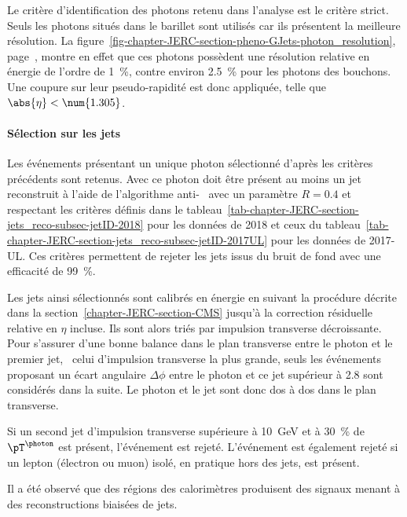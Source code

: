 \par Le critère d'identification des photons retenu dans l'analyse est le critère strict.
Seuls les photons situés dans le barillet sont utilisés car ils présentent la meilleure résolution.
La figure~\ref{fig-chapter-JERC-section-pheno-GJets-photon_resolution}, page~\pageref{fig-chapter-JERC-section-pheno-GJets-photon_resolution}, montre en effet que ces photons possèdent une résolution relative en énergie de l'ordre de \SI{1}{\%}, contre environ \SI{2.5}{\%} pour les photons des bouchons.
Une coupure sur leur pseudo-rapidité est donc appliquée, telle que $\abs{\eta} < \num{1.305}$.
\par {}
\paragraph{Sélection sur les jets}
Les événements présentant un unique photon sélectionné d'après les critères précédents sont retenus.
Avec ce photon doit être présent au moins un jet reconstruit à l'aide de l'algorithme anti-\kT~\cite{Cacciari_antikT} avec un paramètre $R=\num{0.4}$ et respectant les critères définis dans le tableau~\ref{tab-chapter-JERC-section-jets_reco-subsec-jetID-2018} pour les données de 2018 et ceux du tableau~\ref{tab-chapter-JERC-section-jets_reco-subsec-jetID-2017UL} pour les données de 2017-UL.
Ces critères permettent de rejeter les jets issus du bruit de fond avec une efficacité de \SI{99}{\%}.
\par Les jets ainsi sélectionnés sont calibrés en énergie en suivant la procédure décrite dans la section~\ref{chapter-JERC-section-CMS} jusqu'à la correction résiduelle relative en $\eta$ incluse. Ils sont alors triés par impulsion transverse décroissante.
Pour s'assurer d'une bonne balance dans le plan transverse entre le photon et le premier jet, \ie\ celui d'impulsion transverse la plus grande, seuls les événements proposant un écart angulaire $\Delta\phi$ entre le photon et ce jet supérieur à \SI{2.8}{\rad} sont considérés dans la suite.
Le photon et le jet sont donc dos à dos dans le plan transverse.
\par Si un second jet d'impulsion transverse supérieure à \SI{10}{\GeV} et à \SI{30}{\%} de $\pT^{\photon}$ est présent, l'événement est rejeté.
L'événement est également rejeté si un lepton (électron ou muon) isolé, en pratique hors des jets, est présent.
\par Il a été observé que des régions des calorimètres produisent des signaux menant à des reconstructions biaisées de jets.

